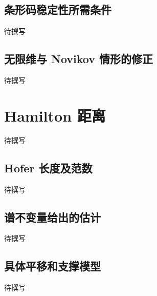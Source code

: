 \subsection{条形码稳定性所需条件}
\label{g4:subsec:E02:03}
待撰写

\subsection{无限维与 Novikov 情形的修正}
\label{g4:subsec:E02:04}
待撰写

\section{Hamilton 距离}
\label{g4:sec:E03}
待撰写

\subsection{Hofer 长度及范数}
\label{g4:subsec:E03:01}
待撰写

\subsection{谱不变量给出的估计}
\label{g4:subsec:E03:02}
待撰写

\subsection{具体平移和支撑模型}
\label{g4:subsec:E03:03}
待撰写
